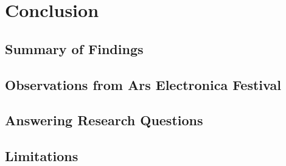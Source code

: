 \chapter{Conclusion}
    \section{Summary of Findings}
    \section{Observations from Ars Electronica Festival} 
    \section{Answering Research Questions}
    \section{Limitations}